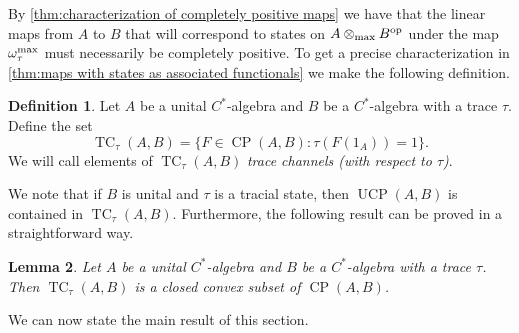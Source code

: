 \documentclass[11pt, a4paper, oneside, final, reqno]{amsart}
\newcommand{\CP}{\operatorname{CP}}
\newcommand{\UCP}{\operatorname{UCP}}
\newcommand{\TC}{\operatorname{TC}}
\theoremstyle{definition}
\newtheorem{definition}{Definition}[section]
\theoremstyle{plain}
\newtheorem{lemma}[definition]{Lemma}
\theoremstyle{remark}
\numberwithin{equation}{section}
\begin{document}
By \cref{thm:characterization of completely positive maps} we have that the linear maps from $A$ to $B$ that will correspond to states on $A \otimes_{\rm max} B^{\rm op}$ under the map $\omega_\tau^{\rm max}$ must necessarily be completely positive. To get a precise characterization in \cref{thm:maps with states as associated functionals} we make the following definition.

\begin{definition}\label{def:trace channels}
    Let $A$ be a unital $C^*$-algebra and $B$ be a $C^*$-algebra with a trace $\tau$. Define the set
    \begin{equation*}
        \TC_\tau(A,B) = \{ F \in \CP(A,B) : \tau(F(1_A)) = 1 \}.
    \end{equation*}
    We will call elements of $\TC_\tau(A,B)$ \emph{trace channels (with respect to $\tau$)}.
\end{definition}
We note that if $B$ is unital and $\tau$ is a tracial state, then $\UCP(A,B)$ is contained in $\TC_\tau(A,B)$. Furthermore, the following result can be proved in a straightforward way. 

\begin{lemma}\label{lemma:trace channels is a convex set}
    Let $A$ be a unital $C^*$-algebra and $B$ be a $C^*$-algebra with a trace $\tau$. Then $\TC_\tau(A,B)$ is a closed convex subset of $\CP(A,B)$.
\end{lemma}


We can now state the main result of this section.
\end{document}
